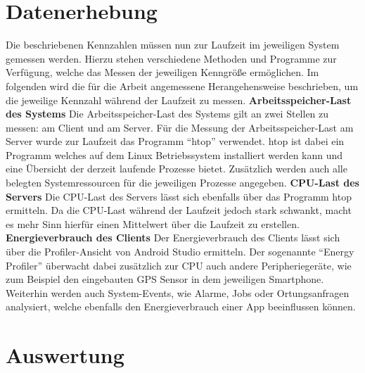 \section{Datenerhebung}
Die beschriebenen Kennzahlen müssen nun zur Laufzeit im jeweiligen System gemessen werden.
Hierzu stehen verschiedene Methoden und Programme zur Verfügung, welche das Messen der jeweiligen Kenngröße ermöglichen.
Im folgenden wird die für die Arbeit angemessene Herangehensweise beschrieben, um die jeweilige Kennzahl während der Laufzeit zu messen.\newline\newline
\textbf{Arbeitsspeicher-Last des Systems}\newline
Die Arbeitsspeicher-Last des Systems gilt an zwei Stellen zu messen: am Client und am Server.
Für die Messung der Arbeitsspeicher-Last am Server wurde zur Laufzeit das Programm "`htop"' verwendet.
htop ist dabei ein Programm welches auf dem Linux Betriebssystem installiert werden kann und eine Übersicht der derzeit laufende Prozesse bietet.
Zusätzlich werden auch alle belegten Systemressourcen für die jeweiligen Prozesse angegeben.\newline\newline
\textbf{CPU-Last des Servers}\newline
Die CPU-Last des Servers lässt sich ebenfalls über das Programm htop ermitteln. 
Da die CPU-Last während der Laufzeit jedoch stark schwankt, macht es mehr Sinn hierfür einen Mittelwert über die Laufzeit zu erstellen.\newline\newline
\textbf{Energieverbrauch des Clients}\newline
Der Energieverbrauch des Clients lässt sich über die Profiler-Ansicht von Android Studio ermitteln.
Der sogenannte "`Energy Profiler"' überwacht dabei zusätzlich zur CPU auch andere Peripheriegeräte, wie zum Beispiel den eingebauten GPS Sensor in dem jeweiligen Smartphone.
Weiterhin werden auch System-Events, wie Alarme, Jobs oder Ortungsanfragen analysiert, welche ebenfalls den Energieverbrauch einer App beeinflussen können.\newline\newline

\newpage


\section{Auswertung}
